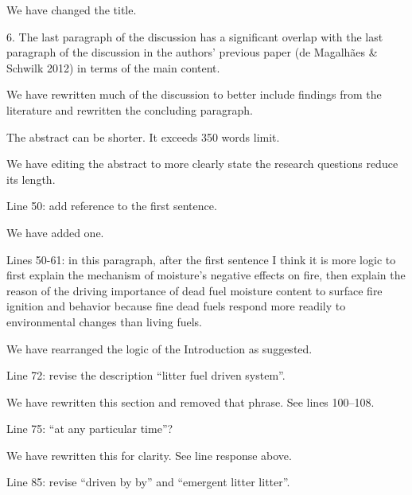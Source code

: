 \documentclass[letterpaper, 12pt]{letter}
\begin{document}
\begin{letter}{}
We have changed the title.

\begin{quoting}
  6. The last paragraph of the discussion has a significant overlap with the
  last paragraph of the discussion in the authors’ previous paper (de Magalhães
  \& Schwilk 2012) in terms of the main content.
\end{quoting}

We have rewritten much of the discussion to better include findings from the
literature and rewritten the concluding paragraph.

\begin{quoting}
The abstract can be shorter. It exceeds 350 words limit. 
\end{quoting}

We have editing the abstract to more clearly state the research questions
reduce its length.

\begin{quoting}
Line 50: add reference to the first sentence.
\end{quoting}

We have added one.

\begin{quoting}
  Lines 50-61: in this paragraph, after the first sentence I think it is more
  logic to first explain the mechanism of moisture’s negative effects on fire,
  then explain the reason of the driving importance of dead fuel moisture
  content to surface fire ignition and behavior because fine dead fuels respond
  more readily to environmental changes than living fuels.
\end{quoting}

We have rearranged the logic of the Introduction as suggested.

\begin{quoting}
Line 72: revise the description ``litter fuel driven system''.
\end{quoting}

We have rewritten this section and removed that phrase. See lines 100--108.

\begin{quoting}
Line 75: “at any particular time”?
\end{quoting}

We have rewritten this for clarity. See line response above.

\begin{quoting}
Line 85: revise ``driven by by'' and ``emergent litter litter''.
\end{quoting}


\end{letter}
\end{document}
